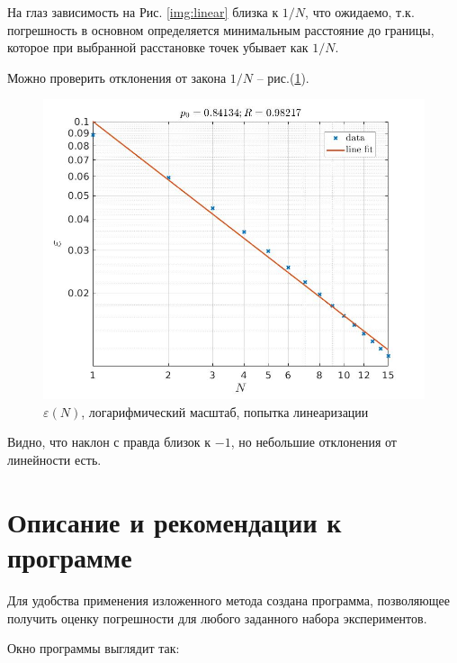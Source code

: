 \documentclass[a4paper,12pt]{article} %
\begin{document}
\newpage

На глаз зависимость на Рис. \ref{img:linear} близка к $1/N$, что ожидаемо, т.к. погрешность в основном определяется минимальным расстояние до границы, которое при выбранной расстановке точек убывает как $1/N$. 

Можно проверить отклонения от закона $1/N$ -- рис.(\ref{img:log}).

\begin{figure}[h!]
\begin{center}
\includegraphics[width=1\textwidth]{./pics/log}
\end{center}
\caption{$\varepsilon(N)$, логарифмический масштаб, попытка линеаризации} \label{img:log}
\end{figure}

Видно, что наклон с правда близок к $-1$, но небольшие отклонения от линейности есть.

\newpage

\section{Описание и рекомендации к программе}

Для удобства применения изложенного метода создана программа, позволяющее получить оценку погрешности для любого заданного набора экспериментов.

Окно программы выглядит так:
\end{document}

